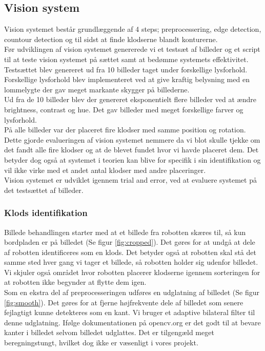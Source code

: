 \subsection{Vision system}
Vision systemet består grundlæggende af 4 steps; preprocessering, edge detection, countour detection og til sidst at finde klodserne blandt konturerne. \\

Før udviklingen af vision systemet genererede vi et testsæt af billeder og et script til at teste vision systemet på sættet samt at bedømme systemets effektivitet.
Testsættet blev genereret ud fra 10 billeder taget under forskellige lysforhold.
Forskellige lysforhold blev implementeret ved at give kraftig belysning med en lommelygte der gav meget markante skygger på billederne. \\
Ud fra de 10 billeder blev der genereret eksponentielt flere billeder ved at ændre brightness, contrast og hue.
Det gav billeder med meget forskellige farver og lysforhold. \\
På alle billeder var der placeret fire klodser med samme position og rotation.
Dette gjorde evalueringen af vision systemet nemmere da vi blot skulle tjekke om det fandt alle fire klodser og at de blevet fundet hvor vi havde placeret dem.
Det betyder dog også at systemet i teorien kan blive for specifik i sin identifikation og vil ikke virke med et andet antal klodser med andre placeringer. \\

Vision systemet er udviklet igennem trial and error, ved at evaluere systemet på det testsættet af billeder. \\

\subsubsection{Klods identifikation}

Billede behandlingen starter med at et billede fra robotten skæres til, så kun bordpladen er på billedet (Se figur \ref{fig:cropped}).
Det gøres for at undgå at dele af robotten identificeres som en klods.
Det betyder også at robotten skal stå det samme sted hver gang vi tager et billede, så robotten holder sig udenfor billedet.
Vi skjuler også området hvor robotten placerer klodserne igennem sorteringen for at robotten ikke begynder at flytte dem igen. \\

Som en ekstra del af preprocesseringen udføres en udglatning af billedet (Se figur \ref{fig:smooth}).
Det gøres for at fjerne højfrekvente dele af billedet som senere fejlagtigt kunne detekteres som en kant.
Vi bruger et adaptive bilateral filter til denne udglatning.
Ifølge dokumentationen på opencv.org er det godt til at bevare kanter i billedet selvom billedet udglattes. Det er tilgengæld meget beregningstungt, hvilket dog ikke er væsenligt i vores projekt. \\

